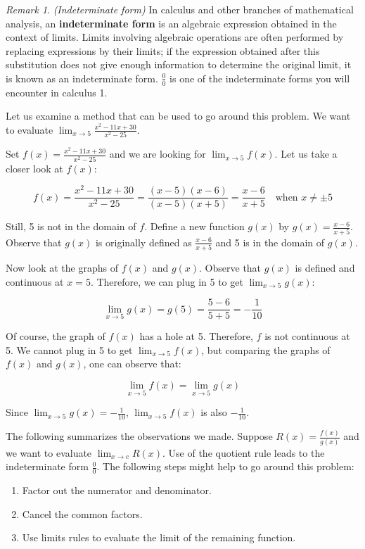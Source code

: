 \documentclass[
]{book}
\theoremstyle{definition}
\theoremstyle{definition}
\theoremstyle{definition}
\theoremstyle{definition}
\theoremstyle{remark}
\newtheorem*{remark}{Remark}
\begin{document}
\begin{remark}

\emph{(Indeterminate form)} In calculus and other branches of
mathematical analysis, an \textbf{indeterminate form} is an algebraic
expression obtained in the context of limits. Limits involving algebraic operations are often performed by replacing expressions by their limits;
if the expression obtained after this substitution does not give enough
information to determine the original limit, it is known as an
indeterminate form. \(\frac{0}{0}\) is one of the indeterminate forms you
will encounter in calculus 1.

Let us examine a method that can be used to go around this problem. We
want to evaluate \(\lim_{{x \to 5}} \frac{x^2 - 11x + 30}{x^2 - 25}\).

Set \(f(x) = \frac{x^2 - 11x + 30}{x^2 - 25}\) and we are looking for
\(\lim_{{x \to 5}} f(x)\). Let us take a closer look at \(f(x)\):

\[f(x) = \frac{x^2 - 11x + 30}{x^2 - 25} = \frac{(x - 5)(x - 6)}{(x - 5)(x + 5)} = \frac{x - 6}{x + 5} \quad \text{when } x \neq \pm 5\]

Still, 5 is not in the domain of \(f\). Define a new function \(g(x)\) by
\(g(x) = \frac{x - 6}{x + 5}\). Observe that \(g(x)\) is originally defined
as \(\frac{x - 6}{x + 5}\) and 5 is in the domain of \(g(x)\).

Now look at the graphs of \(f(x)\) and \(g(x)\). Observe that \(g(x)\) is
defined and continuous at \(x = 5\). Therefore, we can plug in 5 to get
\(\lim_{{x \to 5}} g(x)\):

\[\lim_{{x \to 5}} g(x) = g(5) = \frac{5 - 6}{5 + 5} = -\frac{1}{10}\]

Of course, the graph of \(f(x)\) has a hole at 5. Therefore, \(f\) is not
continuous at 5. We cannot plug in 5 to get \(\lim_{{x \to 5}} f(x)\), but
comparing the graphs of \(f(x)\) and \(g(x)\), one can observe that:

\[\lim_{{x \to 5}} f(x) = \lim_{{x \to 5}} g(x)\]

Since \(\lim_{{x \to 5}} g(x) = -\frac{1}{10}\), \(\lim_{{x \to 5}} f(x)\)
is also \(-\frac{1}{10}\).

The following summarizes the observations we made. Suppose
\(R(x) = \frac{f(x)}{g(x)}\) and we want to evaluate
\(\lim_{{x \to c}} R(x)\). Use of the quotient rule leads to the
indeterminate form \(\frac{0}{0}\). The following steps might help to go
around this problem:

\begin{enumerate}
\def\labelenumi{\arabic{enumi}.}
\item
  Factor out the numerator and denominator.
\item
  Cancel the common factors.
\item
  Use limits rules to evaluate the limit of the remaining function.
\end{enumerate}

\end{remark}
\end{document}
